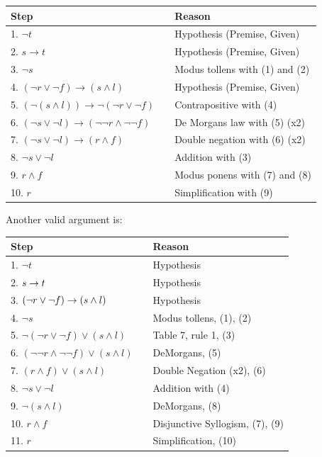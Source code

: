 \begin{questions}
\begin{solution}
    \begin{tabular}{lll}
        Step    & \hspace{0.2in} & Reason \\
        \hline
        1. $\neg t$                 &       & Hypothesis (Premise, Given) \\
        2. $s \rightarrow t$        &       & Hypothesis (Premise, Given) \\
        3. $\neg s$                 &       & Modus tollens with (1) and (2) \\
        4. $(\neg r \vee \neg f) \rightarrow (s \wedge l)$  &   & Hypothesis (Premise, Given)  \\
        5. $(\neg(s \wedge l)) \rightarrow \neg(\neg r \vee \neg f)$    & & Contrapositive with (4) \\
        6. $(\neg s \vee \neg l) \rightarrow (\neg \neg r \wedge \neg \neg f)$ & & De Morgans law with (5) (x2) \\
        7. $(\neg s \vee \neg l) \rightarrow (r \wedge f)$  & & Double negation with (6) (x2) \\
        8. $\neg s \vee \neg l$     &       & Addition with (3) \\
        9. $r \wedge f$             &       & Modus ponens with (7) and (8) \\
        10. $r$                     &       & Simplification with (9)
    \end{tabular}

    \medskip
    Another valid argument is:

    \begin{tabular}{lll}
        Step   & \hspace{0.2in}     & Reason \\
        \hline
        1. $\neg t$                 &   & Hypothesis \\
        2. $s \rightarrow t$                &   & Hypothesis \\
        3. $(\neg r \vee \neg f) \rightarrow (s \wedge l)$  &   & Hypothesis \\
        4. $\neg s$                 &   & Modus tollens, (1), (2) \\
        5. $\neg (\neg r \vee \neg f) \vee (s \wedge l) $  & & Table 7, rule 1, (3) \\
        6. $(\neg \neg r \wedge \neg \neg f) \vee (s \wedge l)$  & & DeMorgans,  (5) \\
        7. $(r \wedge f) \vee (s \wedge l)$     & & Double Negation (x2), (6) \\
        8. $\neg s \vee \neg l$     &   & Addition with (4) \\
        9. $\neg (s \wedge l)$      &   & DeMorgans, (8) \\
        10. $r \wedge f$            &   & Disjunctive Syllogism, (7), (9) \\
        11. $r$                     &   & Simplification, (10)
    \end{tabular}



\end{solution}
\end{questions}
